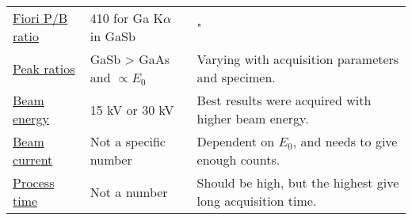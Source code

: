 \begin{table}[hbpt]
\begin{center}
\begin{tabular}{p{2.5cm}p{4cm}p{7cm}}
            \hyperref[results:fiori]{Fiori P/B ratio}                     & 410 for Ga K$\alpha$ in GaSb  & "                                                                                                                                                                                                      \\
            \hyperref[results:peak_ratios]{Peak ratios}                   & GaSb > GaAs and $\propto E_0$ & Varying with acquisition parameters and specimen.                                                                                                                                                      \\
            \hline%
            \hyperref[results:beam_energy_and_beam_current]{Beam energy}  & 15 kV or 30 kV                & Best results were acquired with higher beam energy.                                                                                                                                                    \\
            \hyperref[results:beam_energy_and_beam_current]{Beam current} & Not a specific number         & Dependent on $E_0$, and needs to give enough counts.                                                                                                                                                   \\
            \hyperref[results:process_time]{Process time}                 & Not a number                  & Should be high, but the highest give long acquisition time.                                                                                                                                            \\
            \hline
        \end{tabular}
    \end{center}
\end{table}
